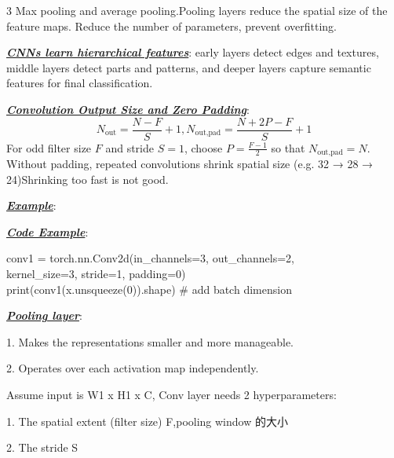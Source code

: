 \documentclass[12pt]{article}
\newcommand{\bulletPoint}[1]{\underline{\textit{\textbf{#1}}}}
\begin{document}
\begin{multicols*}{3}
Max pooling and average pooling.Pooling layers reduce the spatial size of the feature maps. Reduce the number of parameters, prevent overfitting.


\bulletPoint{CNNs learn hierarchical features}: early layers detect edges and textures, middle layers detect parts and patterns, and deeper layers capture semantic features for final classification.

\bulletPoint{Convolution Output Size and Zero Padding}:
\useshortskip
\begin{equation*}
N_{\text{out}} = \frac{N-F}{S}+1, 
N_{\text{out,pad}} = \frac{N+2P-F}{S}+1
\end{equation*}
For odd filter size $F$ and stride $S=1$, choose
$P=\frac{F-1}{2}$ so that $N_{\text{out,pad}}=N$.
Without padding, repeated convolutions shrink spatial size (e.g. 32 → 28 → 24)Shrinking too fast is not good.

\bulletPoint{Example}:
\useshortskip\noindent{}

\bulletPoint{Code Example}:
\useshortskip
\noindent\begin{minipage}{\linewidth}
{\color{blue}\ttfamily
conv1 = torch.nn.Conv2d(in\_channels=3, out\_channels=2,\\
kernel\_size=3, stride=1, padding=0)\\
print(conv1(x.unsqueeze(0)).shape) \# add batch dimension
}
\end{minipage}

\bulletPoint{Pooling layer}:

1. Makes the representations smaller and more manageable.

2. Operates over each activation map independently.

Assume input is W1 x H1 x C, Conv layer needs 2 hyperparameters:

1. The spatial extent (filter size) F,pooling window 的大小

2. The stride S


\end{multicols*}
\end{document}

